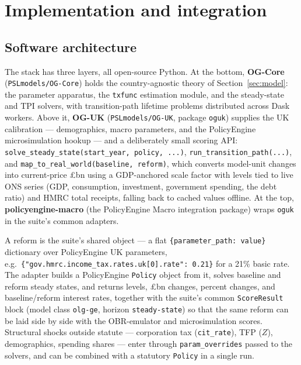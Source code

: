 \section{Implementation and integration}
\label{sec:implementation}

\subsection{Software architecture}
\label{subsec:arch}

The stack has three layers, all open-source Python. At the bottom, \textbf{OG-Core} (\texttt{PSLmodels/\allowbreak OG-Core}) holds the country-agnostic theory of Section~\ref{sec:model}: the parameter apparatus, the \texttt{txfunc} estimation module, and the steady-state and TPI solvers, with transition-path lifetime problems distributed across Dask workers. Above it, \textbf{OG-UK} (\texttt{PSLmodels/OG-UK}, package \texttt{oguk}) supplies the UK calibration --- demographics, macro parameters, and the PolicyEngine microsimulation hookup --- and a deliberately small scoring API: \texttt{solve\_steady\_state(start\_year, policy, ...)}, \texttt{run\_transition\_path(...)}, and \texttt{map\_to\_real\_world(baseline, reform)}, which converts model-unit changes into current-price \pounds bn using a GDP-anchored scale factor with levels tied to live ONS series (GDP, consumption, investment, government spending, the debt ratio) and HMRC total receipts, falling back to cached values offline. At the top, \textbf{policyengine-macro} (the PolicyEngine Macro integration package) wraps \texttt{oguk} in the suite's common adapters.

A reform is the suite's shared object --- a flat \texttt{\{parameter\_path: value\}} dictionary over PolicyEngine UK parameters, e.g.\ \texttt{\{"gov.hmrc.income\_tax.rates.uk[0].rate": 0.21\}} for a 21\% basic rate. The adapter builds a PolicyEngine \texttt{Policy} object from it, solves baseline and reform steady states, and returns levels, \pounds bn changes, percent changes, and baseline/reform interest rates, together with the suite's common \texttt{ScoreResult} block (model class \texttt{olg-ge}, horizon \texttt{steady-state}) so that the same reform can be laid side by side with the OBR-emulator and microsimulation scores. Structural shocks outside statute --- corporation tax (\texttt{cit\_rate}), TFP ($Z$), demographics, spending shares --- enter through \texttt{param\_overrides} passed to the solvers, and can be combined with a statutory \texttt{Policy} in a single run.

